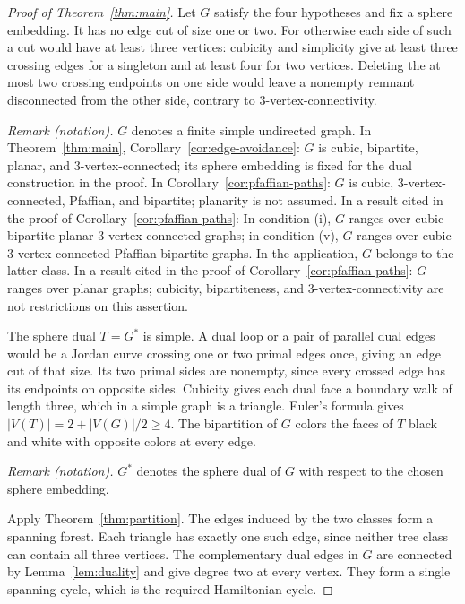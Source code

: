 \documentclass[11pt]{article}
\theoremstyle{remark}
\newcommand{\abs}[1]{\left|#1\right|}
\numberwithin{equation}{section}
\begin{document}
\begin{proof}[Proof of Theorem~\ref{thm:main}]
Let \(G\) satisfy the four hypotheses and fix a sphere
embedding. It has no edge cut of size one or two.
For otherwise each side of such a cut would have
at least three vertices: cubicity and simplicity
give at least three crossing edges for a singleton
and at least four for two vertices.
Deleting the at most two crossing endpoints on
one side would leave a nonempty remnant disconnected
from the other side, contrary to \(3\)-vertex-connectivity.

\noindent\textit{Remark (notation).} $G$ denotes a finite simple undirected graph. In Theorem~\ref{thm:main}, Corollary~\ref{cor:edge-avoidance}: $G$ is cubic, bipartite, planar, and $3$-vertex-connected; its sphere embedding is fixed for the dual construction in the proof. In Corollary~\ref{cor:pfaffian-paths}: $G$ is cubic, $3$-vertex-connected, Pfaffian, and bipartite; planarity is not assumed. In a result cited in the proof of Corollary~\ref{cor:pfaffian-paths}: In condition (i), $G$ ranges over cubic bipartite planar $3$-vertex-connected graphs; in condition (v), $G$ ranges over cubic $3$-vertex-connected Pfaffian bipartite graphs. In the application, $G$ belongs to the latter class. In a result cited in the proof of Corollary~\ref{cor:pfaffian-paths}: $G$ ranges over planar graphs; cubicity, bipartiteness, and $3$-vertex-connectivity are not restrictions on this assertion.


The sphere dual \(T=G^*\) is simple. A dual loop
or a pair of parallel dual edges would be a Jordan
curve crossing one or two primal edges once,
giving an edge cut of that size. Its two primal
sides are nonempty, since every crossed edge
has its endpoints on opposite sides.
Cubicity gives each dual face a boundary walk
of length three, which in a simple graph is
a triangle. Euler's formula gives
\(\abs{V(T)}=2+\abs{V(G)}/2\ge4\).
The bipartition of \(G\) colors the faces of \(T\)
black and white with opposite colors at every edge.

\noindent\textit{Remark (notation).} $G^*$ denotes the sphere dual of $G$ with respect to the chosen sphere embedding.


Apply Theorem~\ref{thm:partition}. The edges induced
by the two classes form a spanning forest.
Each triangle has exactly one such edge, since
neither tree class can contain all three vertices.
The complementary dual edges in \(G\) are connected
by Lemma~\ref{lem:duality} and give degree two at
every vertex. They form a single spanning cycle,
which is the required Hamiltonian cycle.
\end{proof}
\end{document}
